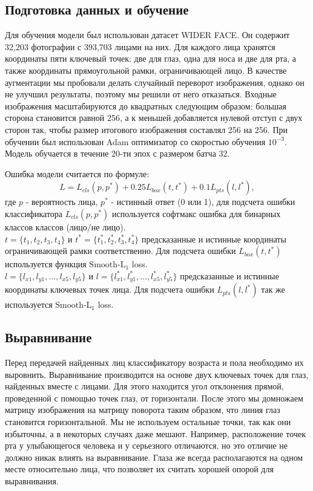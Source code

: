 \subsection{Подготовка данных и обучение}\label{subsec:подготовка-данных-и-обучение}
Для обучения модели был использован датасет WIDER FACE\@.
Он содержит 32,203 фотографии с 393,703 лицами на них.
Для каждого лица хранятся координаты пяти ключевый точек: две для глаз, одна для носа и две для рта,
а также координаты прямоугольной рамки, ограничивающей лицо.
В качестве аугментации мы пробовали делать случайный переворот изображения,
однако он не улучшил результаты, поэтому мы решили от него отказаться.
Входные изображения масштабируются до квадратных следующим образом: большая сторона становится равной 256,
а к меньшей добавляется нулевой отступ с двух сторон так, чтобы размер итогового изображения составлял 256 на 256.
При обучении был использован Adam оптимизатор со скоростью обучения $10^{-3}$.
Модель обучается в течение 20-ти эпох с размером батча 32.
\par Ошибка модели считается по формуле: \[L = L_{cls}(p, p^*) + 0.25 L_{box}(t, t^*) + 0.1 L_{pts}(l, l^*),\]
где $p$ - вероятность лица, $p^*$ - истинный ответ (0 или 1),
для подсчета ошибки классификатора $L_{cls}(p, p^*)$ используется софтмакс ошибка для бинарных классов классов (лицо/не лицо).\\
$t = \{t_1, t_2, t_3, t_4\}$ и $t^* = \{t^*_1, t^*_2, t^*_3, t^*_4\}$ предсказанные и истинные координаты ограничивающей рамки соответственно.
Для подсчета ошибки $L_{box}(t, t^*)$ используется функция $\text{Smooth-L}_1$ loss.
\\$l = \{l_{x1}, l_{y1}, \dots, l_{x5}, l_{y5}\}$ и $l = \{l^*_{x1}, l^*_{y1}, \dots, l^*_{x5}, l^*_{y5}\}$ предсказанные и истинные координаты ключевых точек лица.
Для подсчета ошибки $L_{pts}(l, l^*)$ так же используется $\text{Smooth-L}_1$ loss.

\subsection{Выравнивание}\label{subsec:выравнивание}
Перед передачей найденных лиц классификатору возраста и пола необходимо их выровнить.
Выравнивание производится на основе двух ключевых точек для глаз, найденных вместе с лицами.
Для этого находится угол отклонения прямой, проведенной с помощью точек глаз, от горизонтали.
После этого мы домножаем матрицу изображения на матрицу поворота таким образом, что линия глаз становится горизонтальной.
Мы не используем остальные точки, так как они избыточны, а в некоторых случаях даже мешают.
Например, расположение точек рта у улыбающегося человека и у серьезного отличаются, но это отличие не должно никак влиять на выравнивание.
Глаза же всегда располагаются на одном месте относительно лица, что позволяет их считать хорошей опорой для выравнивания.

